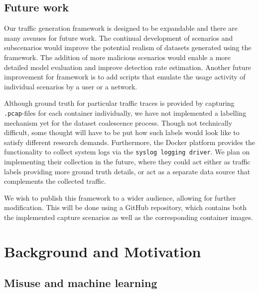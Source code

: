 \documentclass[sigconf]{acmart}
\begin{document}


\subsection{Future work}

Our traffic generation framework is designed to be expandable and there are many avenues for future work. The continual development of scenarios and subscenarios would improve the potential realism of datasets generated using the framework. The addition of more malicious scenarios would enable a more detailed model evaluation and improve detection rate estimation. 
Another future improvement for framework is to add scripts that emulate the usage activity of individual scenarios by a user or a network. 


Although ground truth for particular traffic traces is provided by capturing \texttt{.pcap}-files for each container individually, we have not implemented a labelling mechanism yet for the dataset coalescence process. Though not technically difficult, some thought will have to be put how such labels would look like to satisfy different research demands.
Furthermore, the Docker platform provides the functionality to collect system logs via the \texttt{syslog logging driver}. We plan on implementing their collection in the future, where they could act either as traffic labels providing more ground truth details, or act as a separate data source that complements the collected traffic.

We wish to publish this framework to a wider audience, allowing for further modification. This will be done using a GitHub repository, which contains both the implemented capture scenarios as well as the corresponding container images.


\section{Background and Motivation}

\subsection{Misuse and machine learning}
\end{document}
